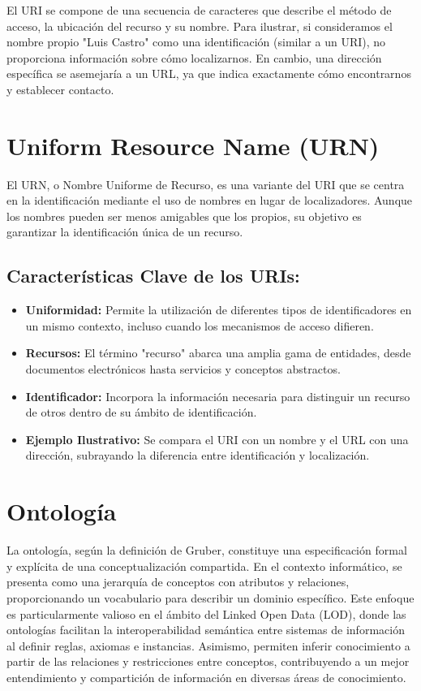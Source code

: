 \documentclass[11pt]{report}
\begin{document}
	El URI se compone de una secuencia de caracteres que describe el método de acceso, la ubicación del recurso y su nombre. Para ilustrar, si consideramos el nombre propio "Luis Castro" como una identificación (similar a un URI), no proporciona información sobre cómo localizarnos. En cambio, una dirección específica se asemejaría a un URL, ya que indica exactamente cómo encontrarnos y establecer contacto.
	
	\section*{Uniform Resource Name (URN)}
	
	El URN, o Nombre Uniforme de Recurso, es una variante del URI que se centra en la identificación mediante el uso de nombres en lugar de localizadores. Aunque los nombres pueden ser menos amigables que los propios, su objetivo es garantizar la identificación única de un recurso.
	
	\subsection*{Características Clave de los URIs:}
	
	\begin{itemize}
		\item \textbf{Uniformidad:} Permite la utilización de diferentes tipos de identificadores en un mismo contexto, incluso cuando los mecanismos de acceso difieren.
		\item \textbf{Recursos:} El término "recurso" abarca una amplia gama de entidades, desde documentos electrónicos hasta servicios y conceptos abstractos.
		\item \textbf{Identificador:} Incorpora la información necesaria para distinguir un recurso de otros dentro de su ámbito de identificación.
		\item \textbf{Ejemplo Ilustrativo:} Se compara el URI con un nombre y el URL con una dirección, subrayando la diferencia entre identificación y localización.
	\end{itemize}
	
	\section*{Ontología}
	
	La ontología, según la definición de Gruber, constituye una especificación formal y explícita de una conceptualización compartida. En el contexto informático, se presenta como una jerarquía de conceptos con atributos y relaciones, proporcionando un vocabulario para describir un dominio específico. Este enfoque es particularmente valioso en el ámbito del Linked Open Data (LOD), donde las ontologías facilitan la interoperabilidad semántica entre sistemas de información al definir reglas, axiomas e instancias. Asimismo, permiten inferir conocimiento a partir de las relaciones y restricciones entre conceptos, contribuyendo a un mejor entendimiento y compartición de información en diversas áreas de conocimiento.
	
\end{document}
